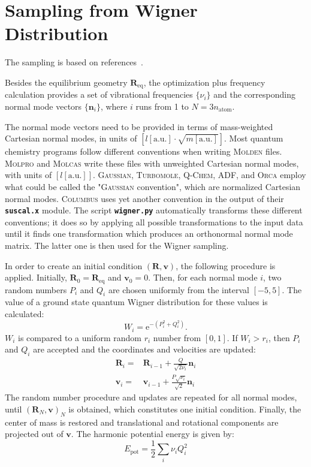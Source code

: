 \documentclass[a4paper,10pt,DIV=15,openany]{scrbook}
\newcommand{\ttt}[1]{\textbf{\texttt{#1}}}
\newcommand{\E}{\ensuremath{\mathrm{e}}}
\newcommand{\VEC}[1]{\ensuremath{\mathbf{#1}}}
\begin{document}
\section{Sampling from Wigner Distribution}\label{met:wigner}

The sampling is based on references~\cite{Dahl1988JCP, Schinke1995}.

Besides the equilibrium geometry $\VEC{R}_{\text{eq}}$, the optimization plus frequency calculation provides a set of vibrational frequencies $\{\nu_i\}$ and the corresponding normal mode vectors $\{\VEC{n}_i\}$, where $i$ runs from 1 to $N=3n_{\text{atom}}$.

The normal mode vectors need to be provided in terms of mass-weighted Cartesian normal modes, in units of $[l[\text{a.u.}]\cdot\sqrt{m[\text{a.u.}]}]$.
Most quantum chemistry programs follow different conventions when writing \textsc{Molden} files. \textsc{Molpro} and \textsc{Molcas} write these files with unweighted Cartesian normal modes, with units of $[l[\text{a.u.}]]$. \textsc{Gaussian}, \textsc{Turbomole}, \textsc{Q-Chem}, \textsc{ADF}, and \textsc{Orca} employ what could be called the "\textsc{Gaussian} convention", which are normalized Cartesian normal modes. \textsc{Columbus} uses yet another convention in the output of their \ttt{suscal.x} module.
The script \ttt{wigner.py} automatically transforms these different conventions; it does so by applying all possible transformations to the input data until it finds one transformation which produces an orthonormal normal mode matrix.
The latter one is then used for the Wigner sampling.

In order to create an initial condition $(\VEC{R},\VEC{v})$, the following procedure is applied. Initially, $\VEC{R}_0=\VEC{R}_{\text{eq}}$ and $\VEC{v}_0=0$. Then, for each normal mode $i$, two random numbers $P_i$ and $Q_i$ are chosen uniformly from the interval $[-5,5]$. The value of a ground state quantum Wigner distribution for these values is calculated:
\begin{equation}
  W_i=\E^{-(P_i^2+Q_i^2)}.
\end{equation}
$W_i$ is compared to a uniform random $r_i$ number from $[0,1]$. If $W_i>r_i$, then $P_i$ and $Q_i$ are accepted and the coordinates and velocities are updated:
\begin{align}
  \VEC{R}_i=&\VEC{R}_{i-1} + \frac{Q}{\sqrt{2\nu_i}}\VEC{n}_i           \label{eq:wigner1}\\
  \VEC{v}_i=&\VEC{v}_{i-1} + \frac{P\sqrt{\nu_i}}{\sqrt{2}}\VEC{n}_i    \label{eq:wigner2}
\end{align}
The random number procedure and updates are repeated for all normal modes, until $(\VEC{R}_N,\VEC{v})_N$ is obtained, which constitutes one initial condition. Finally, the center of mass is restored and translational and rotational components are projected out of $\VEC{v}$. The harmonic potential energy is given by:
\begin{equation}
  E_{\text{pot}}=\frac{1}{2}\sum\limits_i \nu_iQ_i^2
\end{equation}
\end{document}
